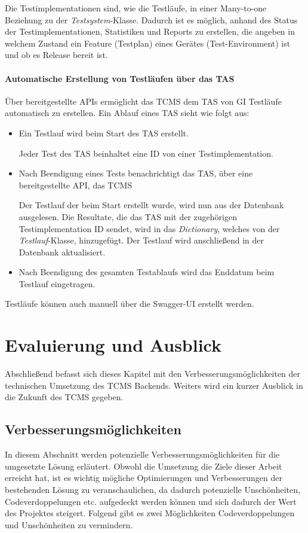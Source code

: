 \documentclass[a4paper, fontsize=11pt, parskip=half, twoside]{scrreprt}
\begin{document}
	Die Testimplementationen sind, wie die Testläufe, in einer Many-to-one Beziehung zu der \emph{Testsystem}-Klasse. 
	Dadurch ist es möglich, anhand des Status der Testimplementationen, Statistiken und Reports zu erstellen, die angeben in welchem Zustand ein Feature (Testplan) eines Gerätes (Test-Environment) ist und ob es Release bereit ist.
	
	\subsubsection{Automatische Erstellung von Testläufen über das TAS}
	Über bereitgestellte \ac{API}s ermöglicht das \ac{TCMS} dem \ac{TAS} von \ac{GI} Testläufe automatisch zu erstellen.
	Ein Ablauf eines \ac{TAS} sieht wie folgt aus:
	
	\begin{itemize}
		\item Ein Testlauf wird beim Start des \ac{TAS} erstellt.
		
		Jeder Test des \ac{TAS} beinhaltet eine \ac{ID} von einer Testimplementation.
		
		\item Nach Beendigung eines Tests benachrichtigt das \ac{TAS}, über eine bereitgestellte \ac{API}, das \ac{TCMS}
		
		Der Testlauf der beim Start erstellt wurde, wird nun aus der Datenbank ausgelesen. 
		Die Resultate, die das \ac{TAS} mit der zugehörigen Testimplementation \ac{ID} sendet, wird in das \emph{Dictionary}, welches von der \emph{Testlauf}-Klasse, hinzugefügt.
		Der Testlauf wird anschließend in der Datenbank aktualisiert.
		
		\item Nach Beendigung des gesamten Testablaufs wird das Enddatum beim Testlauf eingetragen.
	\end{itemize}
	
	Testläufe können auch manuell über die Swagger-UI erstellt werden.
	
	\chapter{Evaluierung und Ausblick}
	Abschließend befasst sich dieses Kapitel mit den Verbesserungsmöglichkeiten der technischen Umsetzung des \ac{TCMS} Backends.
	Weiters wird ein kurzer Ausblick in die Zukunft des \ac{TCMS} gegeben.
	
	\section{Verbesserungsmöglichkeiten}
	In diesem Abschnitt werden potenzielle Verbesserungsmöglichkeiten für die umgesetzte Lösung erläutert.
	Obwohl die Umsetzung die Ziele dieser Arbeit erreicht hat, ist es wichtig mögliche Optimierungen und Verbesserungen der bestehenden Lösung zu veranschaulichen, da dadurch potenzielle Unschönheiten, Codeverdoppelungen etc. aufgedeckt werden können und sich dadurch der Wert des Projektes steigert.
	Folgend gibt es zwei Möglichkeiten Codeverdoppelungen und Unschönheiten zu vermindern.
\end{document}
